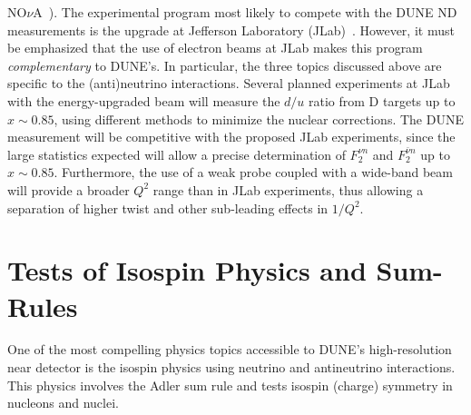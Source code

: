 NO$\nu$A~\cite{Ayres:2007tu}). The %
experimental program %
most likely to compete with the DUNE ND measurements is the  upgrade at
Jefferson Laboratory (JLab)~\cite{Dudek:2012vr}.  However, it must be
emphasized that the use of electron beams at JLab makes this program
\emph{complementary} to DUNE's.  In particular, the three topics
discussed above are specific to the (anti)neutrino interactions.
Several planned experiments at JLab with the energy-upgraded 
beam will measure the $d/u$ ratio from D targets up to $x\sim0.85$, 
using different methods to minimize the nuclear corrections.  
The DUNE measurement %
will be competitive with the
proposed JLab  experiments, since the large statistics expected will allow
a precise determination of $F_2^{\nu
  n}$ and $F_2^{\bar \nu n}$ up to $x\sim0.85$. Furthermore,
the use of a weak probe coupled with a wide-band beam will provide
a broader $Q^2$ range than in JLab experiments, thus allowing a separation of
higher twist and other sub-leading effects in $1/Q^2$.
\section{Tests of Isospin Physics and Sum-Rules}
\label{sec-isospin}

One of the most compelling physics topics accessible to DUNE's high-resolution near detector is the isospin physics using neutrino and antineutrino interactions. This physics involves the Adler sum rule and tests isospin (charge) symmetry in nucleons and nuclei.

